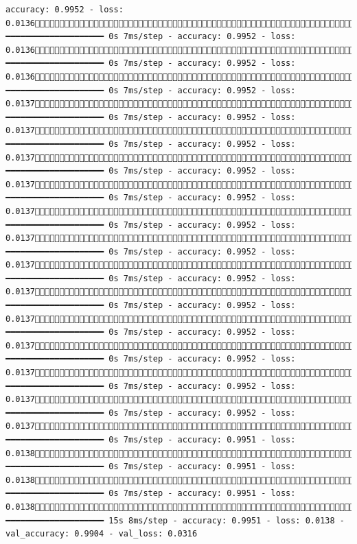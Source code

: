 \documentclass[
  letterpaper,
  DIV=11,
  numbers=noendperiod]{scrreprt}
\begin{document}
\begin{verbatim}
accuracy: 0.9952 - loss: 0.01361743/1875 ━━━━━━━━━━━━━━━━━━━━ 0s 7ms/step - accuracy: 0.9952 - loss: 0.01361751/1875 ━━━━━━━━━━━━━━━━━━━━ 0s 7ms/step - accuracy: 0.9952 - loss: 0.01361758/1875 ━━━━━━━━━━━━━━━━━━━━ 0s 7ms/step - accuracy: 0.9952 - loss: 0.01371765/1875 ━━━━━━━━━━━━━━━━━━━━ 0s 7ms/step - accuracy: 0.9952 - loss: 0.01371773/1875 ━━━━━━━━━━━━━━━━━━━━ 0s 7ms/step - accuracy: 0.9952 - loss: 0.01371780/1875 ━━━━━━━━━━━━━━━━━━━━ 0s 7ms/step - accuracy: 0.9952 - loss: 0.01371787/1875 ━━━━━━━━━━━━━━━━━━━━ 0s 7ms/step - accuracy: 0.9952 - loss: 0.01371795/1875 ━━━━━━━━━━━━━━━━━━━━ 0s 7ms/step - accuracy: 0.9952 - loss: 0.01371803/1875 ━━━━━━━━━━━━━━━━━━━━ 0s 7ms/step - accuracy: 0.9952 - loss: 0.01371810/1875 ━━━━━━━━━━━━━━━━━━━━ 0s 7ms/step - accuracy: 0.9952 - loss: 0.01371818/1875 ━━━━━━━━━━━━━━━━━━━━ 0s 7ms/step - accuracy: 0.9952 - loss: 0.01371825/1875 ━━━━━━━━━━━━━━━━━━━━ 0s 7ms/step - accuracy: 0.9952 - loss: 0.01371832/1875 ━━━━━━━━━━━━━━━━━━━━ 0s 7ms/step - accuracy: 0.9952 - loss: 0.01371839/1875 ━━━━━━━━━━━━━━━━━━━━ 0s 7ms/step - accuracy: 0.9952 - loss: 0.01371846/1875 ━━━━━━━━━━━━━━━━━━━━ 0s 7ms/step - accuracy: 0.9952 - loss: 0.01371854/1875 ━━━━━━━━━━━━━━━━━━━━ 0s 7ms/step - accuracy: 0.9951 - loss: 0.01381862/1875 ━━━━━━━━━━━━━━━━━━━━ 0s 7ms/step - accuracy: 0.9951 - loss: 0.01381869/1875 ━━━━━━━━━━━━━━━━━━━━ 0s 7ms/step - accuracy: 0.9951 - loss: 0.01381875/1875 ━━━━━━━━━━━━━━━━━━━━ 15s 8ms/step - accuracy: 0.9951 - loss: 0.0138 - val_accuracy: 0.9904 - val_loss: 0.0316
\end{verbatim}
\end{document}
